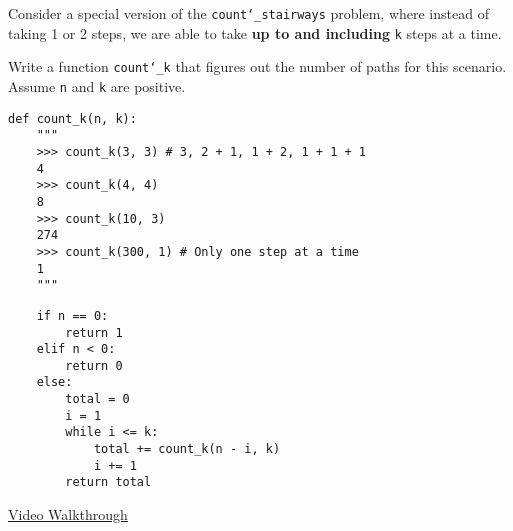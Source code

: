 \question Consider a special version of the \texttt{count\char`_stairways}
problem, where instead of taking 1 or 2 steps, we are able to take
\textbf{up to and including} \texttt{k} steps at a time.

Write a function \texttt{count\char`_k} that figures out the number of
paths for this scenario. Assume \texttt{n} and \texttt{k} are positive.

\begin{lstlisting}
def count_k(n, k):
    """
    >>> count_k(3, 3) # 3, 2 + 1, 1 + 2, 1 + 1 + 1
    4
    >>> count_k(4, 4)
    8
    >>> count_k(10, 3)
    274
    >>> count_k(300, 1) # Only one step at a time
    1
    """
\end{lstlisting}

\begin{solution}[1in]
\begin{lstlisting}
    if n == 0:
        return 1
    elif n < 0:
        return 0
    else:
        total = 0
        i = 1
        while i <= k:
            total += count_k(n - i, k)
            i += 1
        return total
\end{lstlisting}
\href{https://www.youtube.com/watch?v=oGBcPguM9vo&list=PLx38hZJ5RLZd35oDi3TGz5p9DyyxU3WwA&index=5}{Video Walkthrough}
\end{solution}
